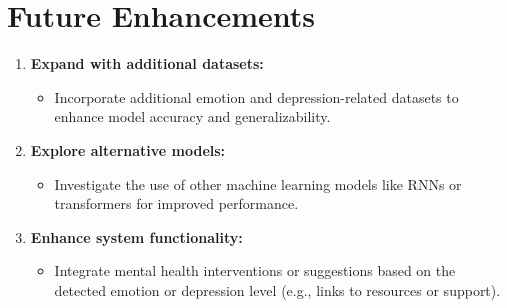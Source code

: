 \section{Future Enhancements}

\begin{enumerate}
    \item \textbf{Expand with additional datasets:}
    \begin{itemize}
        \item Incorporate additional emotion and depression-related datasets to enhance model accuracy and generalizability.
    \end{itemize}
    \item \textbf{Explore alternative models:}
    \begin{itemize}
        \item Investigate the use of other machine learning models like RNNs or transformers for improved performance.
    \end{itemize}
    \item \textbf{Enhance system functionality:}
    \begin{itemize}
        \item Integrate mental health interventions or suggestions based on the detected emotion or depression level (e.g., links to resources or support).
    \end{itemize}
\end{enumerate}
